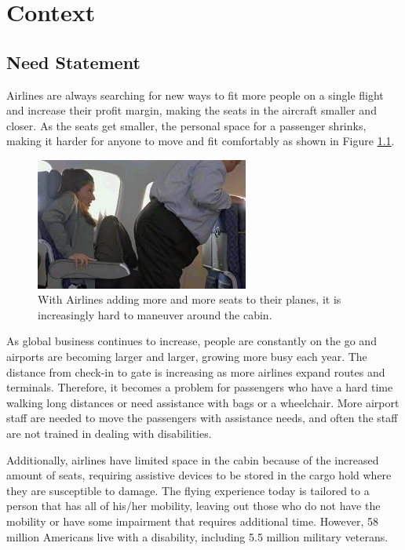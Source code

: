 \chapter{Context}
\label{sec-context} %

\section{Need Statement}
Airlines are always searching for new ways to fit more people on a single flight and increase their profit margin, making the seats in the aircraft smaller and closer. As the seats get smaller, the personal space for a passenger shrinks, making it harder for anyone to move and fit comfortably as shown in Figure \ref{fig:9}.

\begin{figure}[h]
  \centering
     \includegraphics[width=7cm]{images/image009.png}
   \caption{With Airlines adding more and more seats to their planes, it is increasingly hard to maneuver around the cabin. \cite{2014airlines}}
  \label{fig:9}
\end{figure}


As global business continues to increase, people are constantly on the go and airports are becoming larger and larger, growing more busy each year.  The distance from check-in to gate is increasing as more airlines expand routes and terminals. Therefore, it becomes a problem for passengers who have a hard time walking long distances or need assistance with bags or a wheelchair. More airport staff are needed to move the passengers with assistance needs, and often the staff are not trained in dealing with disabilities.  

Additionally, airlines have  limited space in the cabin because of the increased amount of seats, requiring assistive devices  to be stored in the cargo hold where they are susceptible to damage.  The flying experience today is tailored to a person that has all of his/her mobility, leaving out those who do not have the mobility or have some impairment that requires additional time. However, 58 million Americans live with a disability, including 5.5 million military veterans. %

